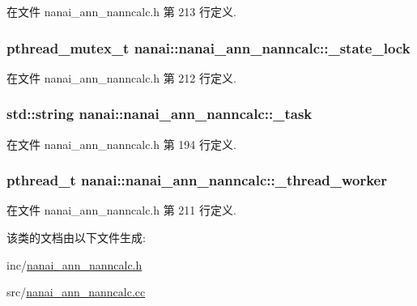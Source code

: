 在文件 nanai\+\_\+ann\+\_\+nanncalc.\+h 第 213 行定义.

\hypertarget{classnanai_1_1nanai__ann__nanncalc_a25ab2c0cf73a5ff7201ad1cd339626dc}{}
\subsubsection[{\+\_\+state\+\_\+lock}]{\setlength{\rightskip}{0pt plus 5cm}pthread\+\_\+mutex\+\_\+t nanai\+::nanai\+\_\+ann\+\_\+nanncalc\+::\+\_\+state\+\_\+lock\hspace{0.3cm}{\ttfamily [protected]}}\label{classnanai_1_1nanai__ann__nanncalc_a25ab2c0cf73a5ff7201ad1cd339626dc}


在文件 nanai\+\_\+ann\+\_\+nanncalc.\+h 第 212 行定义.

\hypertarget{classnanai_1_1nanai__ann__nanncalc_ab659b8655ab02f5922ecb19c6418f02c}{}
\subsubsection[{\+\_\+task}]{\setlength{\rightskip}{0pt plus 5cm}std\+::string nanai\+::nanai\+\_\+ann\+\_\+nanncalc\+::\+\_\+task\hspace{0.3cm}{\ttfamily [protected]}}\label{classnanai_1_1nanai__ann__nanncalc_ab659b8655ab02f5922ecb19c6418f02c}


在文件 nanai\+\_\+ann\+\_\+nanncalc.\+h 第 194 行定义.

\hypertarget{classnanai_1_1nanai__ann__nanncalc_ad8115ff56ea159a5e1d43c9752ed5936}{}
\subsubsection[{\+\_\+thread\+\_\+worker}]{\setlength{\rightskip}{0pt plus 5cm}pthread\+\_\+t nanai\+::nanai\+\_\+ann\+\_\+nanncalc\+::\+\_\+thread\+\_\+worker\hspace{0.3cm}{\ttfamily [protected]}}\label{classnanai_1_1nanai__ann__nanncalc_ad8115ff56ea159a5e1d43c9752ed5936}


在文件 nanai\+\_\+ann\+\_\+nanncalc.\+h 第 211 行定义.



该类的文档由以下文件生成\+:\begin{DoxyCompactItemize}
\item 
inc/\hyperlink{nanai__ann__nanncalc_8h}{nanai\+\_\+ann\+\_\+nanncalc.\+h}\item 
src/\hyperlink{nanai__ann__nanncalc_8cc}{nanai\+\_\+ann\+\_\+nanncalc.\+cc}\end{DoxyCompactItemize}

